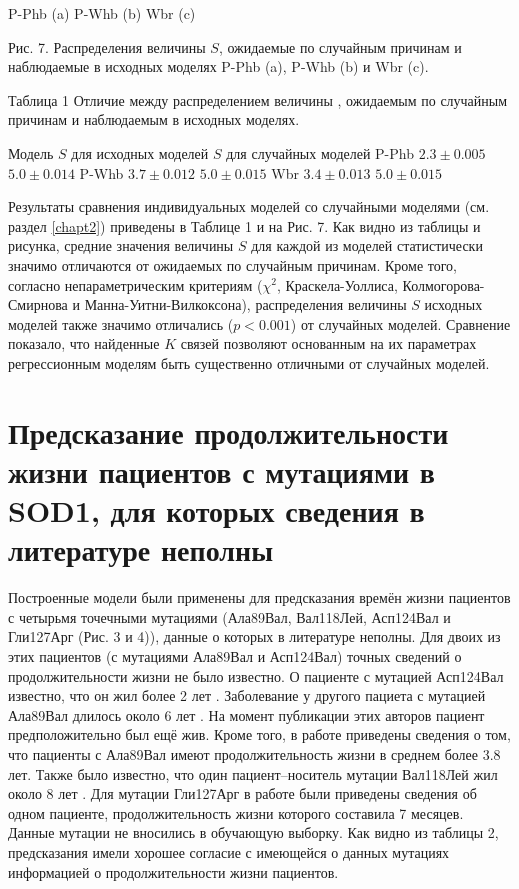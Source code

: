 P-Phb (a)
P-Whb (b)
Wbr (c)

Рис. 7. Распределения величины $S$, ожидаемые по случайным причинам и наблюдаемые в исходных моделях P-Phb (a), P-Whb (b) и Wbr (c).

Таблица 1
Отличие между распределением величины , ожидаемым по случайным причинам и наблюдаемым в исходных моделях.

Модель
$S$ для исходных моделей
$S$ для случайных моделей
P-Phb
$2.3\pm0.005$
$5.0\pm0.014$
P-Whb
$3.7\pm0.012$
$5.0\pm0.015$
Wbr
$3.4\pm0.013$
$5.0\pm0.015$

Результаты сравнения индивидуальных моделей со случайными моделями (см. раздел \ref{chapt2}) приведены в Таблице 1 и на Рис. 7.  Как видно из таблицы и рисунка, средние значения величины $S$ для каждой из моделей статистически значимо отличаются от ожидаемых по случайным причинам. Кроме того, согласно непараметрическим критериям ($\chi^2$, Краскела-Уоллиса, Колмогорова-Смирнова и Манна-Уитни-Вилкоксона), распределения величины $S$ исходных моделей также значимо отличались ($p < 0.001$) от случайных моделей. Сравнение показало, что найденные $K$ связей позволяют основанным на их параметрах регрессионным моделям быть существенно отличными от случайных моделей.

\section{Предсказание продолжительности жизни пациентов с мутациями в SOD1, для которых сведения в литературе неполны} \label{sect_MD_prediction}

Построенные модели были применены для предсказания времён жизни пациентов с четырьмя точечными мутациями (Ала89Вал, Вал118Лей, Асп124Вал и Гли127Арг (Рис.  3 и 4)), данные о которых в литературе неполны. Для двоих из этих пациентов (с мутациями Ала89Вал и Асп124Вал) точных сведений о продолжительности жизни не было известно. О пациенте с мутацией Асп124Вал известно, что он жил более 2 лет \cite{Wang2008}. Заболевание у другого пациета с мутацией Ала89Вал длилось около 6 лет \cite{Sato2005}. На момент публикации этих авторов пациент предположительно был ещё жив. Кроме того, в работе \cite{Wang2008} приведены сведения о том, что пациенты с Ала89Вал имеют продолжительность жизни в среднем более 3.8 лет. Также было известно, что один пациент--носитель мутации Вал118Лей жил около 8 лет \cite{Shimizu2000}. Для мутации Гли127Арг в работе \cite{Holmoy2010} были приведены сведения об одном пациенте, продолжительность жизни которого составила 7 месяцев. Данные мутации не вносились в обучающую выборку. Как видно из таблицы 2, предсказания имели хорошее согласие с имеющейся о данных мутациях информацией о продолжительности жизни пациентов.

